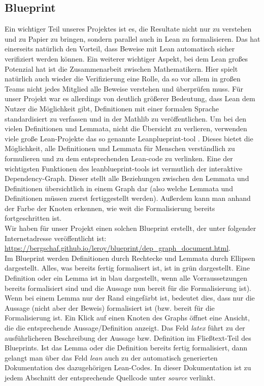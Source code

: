\documentclass{article}
\begin{document}
\subsection{Blueprint}
Ein wichtiger Teil unseres Projektes ist es, die Resultate nicht nur zu verstehen und zu Papier zu bringen, sondern parallel auch in Lean zu formalisieren. Das hat einerseits natürlich den Vorteil, dass Beweise mit Lean automatisch sicher verifiziert werden können. Ein  weiterer wichtiger Aspekt, bei dem Lean großes Potenzial hat ist die Zusammenarbeit zwischen Mathematikern. Hier spielt natürlich auch wieder die Verifizierung eine Rolle, da so vor allem in großen Teams nicht jedes Mitglied alle Beweise verstehen und überprüfen muss. Für unser Projekt war es allerdings von deutlich größerer Bedeutung, dass Lean dem Nutzer die Möglichkeit gibt, Definitionen mit einer formalen Sprache standardisiert zu verfassen und in der Mathlib \autocite{noauthor_leanprover-communitymathlib4_2025} 
zu veröffentlichen. 
Um bei den vielen Definitionen und Lemmata, nicht die Übersicht zu verlieren, verwenden viele große Lean-Projekte das so genannte Leanplueprint-tool \autocite{massot_patrickmassotleanblueprint_2025}. 
Dieses bietet die Möglichkeit, alle Definitionen und Lemmata für Menschen verständlich zu formulieren und zu dem entsprechenden Lean-code zu verlinken. Eine der wichtigsten Funktionen des leanblueprint-tools ist vermutlich der interaktive Dependency-Graph. Dieser stellt alle Beziehungen zwischen den Lemmata und Definitionen übersichtlich in einem Graph dar (also welche Lemmata und Definitionen müssen zuerst fertiggestellt werden). Außerdem kann man anhand der Farbe der Knoten erkennen, wie weit die Formalisierung bereits fortgeschritten ist. \\ 
Wir haben für unser Projekt einen solchen Blueprint erstellt, der unter folgender Internetadresse veröffentlicht ist: \url{https://bergschaf.github.io/leroy/blueprint/dep_graph_document.html}.\\
Im Blueprint werden Definitionen durch Rechtecke und Lemmata durch Ellipsen dargestellt. Alles, was bereits fertig formalisert ist, ist in grün dargestellt. Eine Definition oder ein Lemma ist in blau dargestellt, wenn alle Vorraussetzungen bereits formalisiert sind und die Aussage nun bereit für die Formalisierung ist).\\ Wenn bei einem Lemma nur der Rand eingefärbt ist, bedeutet dies, dass nur die Aussage (nicht aber der Beweis) formalisiert ist (bzw. bereit für die Formalisierung ist. Ein Klick auf einen Knoten des Graphs öffnet eine Ansicht, die die entsprechende Aussage/Definition anzeigt. Das Feld \textit{latex} führt zu der ausführlicheren Beschreibung der Aussage bzw. Definition im Fließtext-Teil des Blueprints. Ist das Lemma oder die Definition bereits fertig formalisiert, dann gelangt man über das Feld \textit{lean} auch zu der automatisch generierten Dokumentation des dazugehörigen Lean-Codes. In dieser Dokumentation ist zu jedem Abschnitt der entsprechende Quellcode unter \textit{source} verlinkt.
\end{document}
